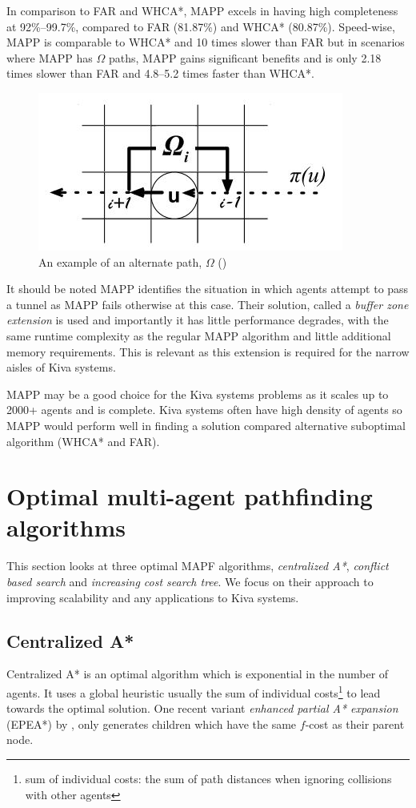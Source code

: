 \documentclass[a4paper,11pt]{article}
\begin{document}
In comparison to FAR and WHCA*, MAPP excels in having high completeness at 92\%--99.7\%, compared to FAR (81.87\%) and WHCA* (80.87\%). Speed-wise, MAPP is comparable to WHCA* and 10 times slower than FAR  but in scenarios where MAPP has $\Omega$ paths, MAPP gains significant benefits and is only 2.18 times slower than FAR and 4.8--5.2 times faster than WHCA*.

\begin{figure}[H]
	\centering
	\includegraphics[width=0.4\linewidth]{graphics/omegapath}
	\caption{An example of an alternate path, $\Omega$ (\cite{wang2011mapp})}
	\label{fig:omegapath}
\end{figure}

It should be noted MAPP identifies the situation in which agents attempt to pass a tunnel as MAPP fails otherwise at this case. Their solution, called a \textit{buffer zone extension} is used and importantly it has little performance degrades, with the same runtime complexity as the regular MAPP algorithm and little additional memory requirements. This is relevant as this extension is required for the narrow aisles of Kiva systems.

MAPP may be a good choice for the Kiva systems problems as it scales up to 2000+ agents and is complete. Kiva systems often have high density of agents so MAPP would perform well in finding a solution compared alternative suboptimal algorithm (WHCA* and FAR).

\section{Optimal multi-agent pathfinding algorithms} \label{sec:optimal}
This section looks at three optimal MAPF algorithms, \textit{centralized A*}, \textit{conflict based search} and \textit{increasing cost search tree}. We focus on their approach to improving scalability and any applications to Kiva systems.

\subsection{Centralized A*}
Centralized A* is an optimal algorithm which is exponential in the number of agents. It uses a global heuristic usually the sum of individual costs\footnote{sum of individual costs: the sum of path distances when ignoring collisions with other agents} to lead towards the optimal solution. One recent variant \textit{enhanced partial A* expansion} (EPEA*) by \cite{goldenberg2014enhanced}, only generates children which have the same $f$-cost as their parent node.
\end{document}
